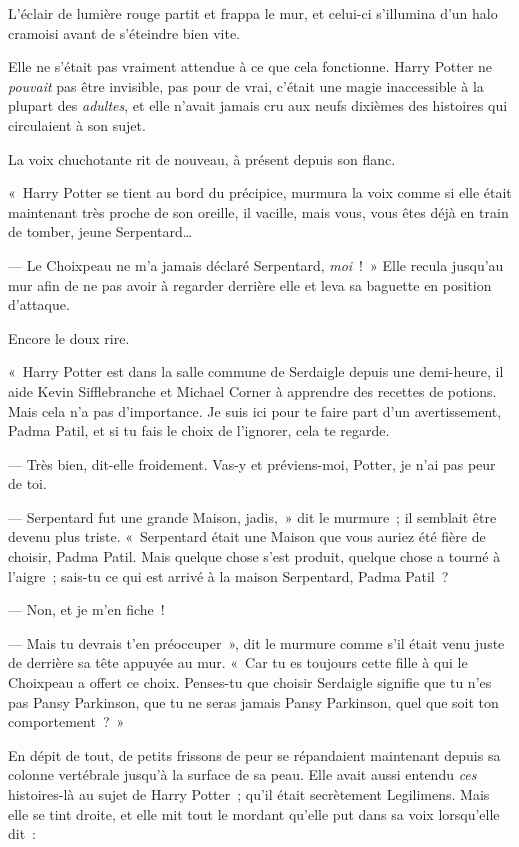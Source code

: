 L'éclair de lumière rouge partit et frappa le mur, et celui-ci s'illumina d'un halo cramoisi avant de s'éteindre bien vite.

Elle ne s'était pas vraiment attendue à ce que cela fonctionne. Harry Potter ne \emph{pouvait} pas être invisible, pas pour de vrai, c'était une magie inaccessible à la plupart des \emph{adultes}, et elle n'avait jamais cru aux neufs dixièmes des histoires qui circulaient à son sujet.

La voix chuchotante rit de nouveau, à présent depuis son flanc.

«~Harry Potter se tient au bord du précipice, murmura la voix comme si elle était maintenant très proche de son oreille, il vacille, mais vous, vous êtes déjà en train de tomber, jeune Serpentard…

--- Le Choixpeau ne m'a jamais déclaré Serpentard, \emph{moi}~!~» Elle recula jusqu'au mur afin de ne pas avoir à regarder derrière elle et leva sa baguette en position d'attaque.

Encore le doux rire.

«~Harry Potter est dans la salle commune de Serdaigle depuis une demi-heure, il aide Kevin Sifflebranche et Michael Corner à apprendre des recettes de potions. Mais cela n'a pas d'importance. Je suis ici pour te faire part d'un avertissement, Padma Patil, et si tu fais le choix de l'ignorer, cela te regarde.

--- Très bien, dit-elle froidement. Vas-y et préviens-moi, Potter, je n'ai pas peur de toi.

--- Serpentard fut une grande Maison, jadis,~» dit le murmure~; il semblait être devenu plus triste. «~Serpentard était une Maison que vous auriez été fière de choisir, Padma Patil. Mais quelque chose s'est produit, quelque chose a tourné à l'aigre~; sais-tu ce qui est arrivé à la maison Serpentard, Padma Patil~?

--- Non, et je m'en fiche~!

--- Mais tu devrais t'en préoccuper~», dit le murmure comme s'il était venu juste de derrière sa tête appuyée au mur. «~Car tu es toujours cette fille à qui le Choixpeau a offert ce choix. Penses-tu que choisir Serdaigle signifie que tu n'es pas Pansy Parkinson, que tu ne seras jamais Pansy Parkinson, quel que soit ton comportement~?~»

En dépit de tout, de petits frissons de peur se répandaient maintenant depuis sa colonne vertébrale jusqu'à la surface de sa peau. Elle avait aussi entendu \emph{ces} histoires-là au sujet de Harry Potter~; qu'il était secrètement Legilimens. Mais elle se tint droite, et elle mit tout le mordant qu'elle put dans sa voix lorsqu'elle dit~:


